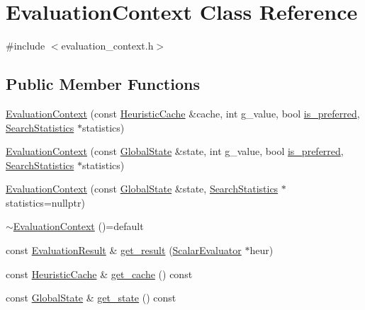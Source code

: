 \hypertarget{classEvaluationContext}{\section{Evaluation\-Context Class Reference}
\label{classEvaluationContext}
}


{\ttfamily \#include $<$evaluation\-\_\-context.\-h$>$}

\subsection*{Public Member Functions}
\begin{DoxyCompactItemize}
\item 
\hyperlink{classEvaluationContext_a71c9f43b9b62c4939ebf7046205d7b8d}{Evaluation\-Context} (const \hyperlink{classHeuristicCache}{Heuristic\-Cache} \&cache, int g\-\_\-value, bool \hyperlink{classEvaluationContext_afb7203396d74b1fb61b76cc0a44b0610}{is\-\_\-preferred}, \hyperlink{classSearchStatistics}{Search\-Statistics} $\ast$statistics)
\item 
\hyperlink{classEvaluationContext_a48cdd3805cba557037e353b94da5075e}{Evaluation\-Context} (const \hyperlink{classGlobalState}{Global\-State} \&state, int g\-\_\-value, bool \hyperlink{classEvaluationContext_afb7203396d74b1fb61b76cc0a44b0610}{is\-\_\-preferred}, \hyperlink{classSearchStatistics}{Search\-Statistics} $\ast$statistics)
\item 
\hyperlink{classEvaluationContext_addd016c1c824ea3372fe94293cffbccc}{Evaluation\-Context} (const \hyperlink{classGlobalState}{Global\-State} \&state, \hyperlink{classSearchStatistics}{Search\-Statistics} $\ast$statistics=nullptr)
\item 
\hyperlink{classEvaluationContext_afe96180b6e67a0719fda86142848da3e}{$\sim$\-Evaluation\-Context} ()=default
\item 
const \hyperlink{classEvaluationResult}{Evaluation\-Result} \& \hyperlink{classEvaluationContext_a74c1d7b061b2bb69a481faa4abac62c0}{get\-\_\-result} (\hyperlink{classScalarEvaluator}{Scalar\-Evaluator} $\ast$heur)
\item 
const \hyperlink{classHeuristicCache}{Heuristic\-Cache} \& \hyperlink{classEvaluationContext_a0935497a024c42e47e105c2247a2f492}{get\-\_\-cache} () const 
\item 
const \hyperlink{classGlobalState}{Global\-State} \& \hyperlink{classEvaluationContext_a21399aa76c2baaf352922c8ad203eed7}{get\-\_\-state} () const 
\item 

\end{DoxyCompactItemize}
